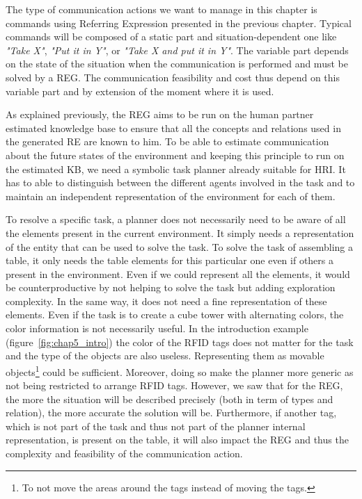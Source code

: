 The type of communication actions we want to manage in this chapter is commands using Referring Expression presented in the previous chapter. Typical commands will be composed of a static part and situation-dependent one like \textit{"Take X"}, \textit{"Put it in Y"}, or \textit{"Take X and put it in Y"}. The variable part depends on the state of the situation when the communication is performed and must be solved by a REG. The communication feasibility and cost thus depend on this variable part and by extension of the moment where it is used.

As explained previously, the REG aims to be run on the human partner estimated knowledge base to ensure that all the concepts and relations used in the generated RE are known to him. To be able to estimate communication about the future states of the environment and keeping this principle to run on the estimated KB, we need a symbolic task planner already suitable for HRI. It has to able to distinguish between the different agents involved in the task and to maintain an independent representation of the environment for each of them.

To resolve a specific task, a planner does not necessarily need to be aware of all the elements present in the current environment. It simply needs a representation of the entity that can be used to solve the task. To solve the task of assembling a table, it only needs the table elements for this particular one even if others a present in the environment. Even if we could represent all the elements, it would be counterproductive by not helping to solve the task but adding exploration complexity.
In the same way, it does not need a fine representation of these elements. Even if the task is to create a cube tower with alternating colors, the color information is not necessarily useful. In the introduction example (figure~\ref{fig:chap5_intro}) the color of the RFID tags does not matter for the task and the type of the objects are also useless. Representing them as movable objects\footnote{To not move the areas around the tags instead of moving the tags.} could be sufficient. Moreover, doing so make the planner more generic as not being restricted to arrange RFID tags. However, we saw that for the REG, the more the situation will be described precisely (both in term of types and relation), the more accurate the solution will be. Furthermore, if another tag, which is not part of the task and thus not part of the planner internal representation, is present on the table, it will also impact the REG and thus the complexity and feasibility of the communication action. 

